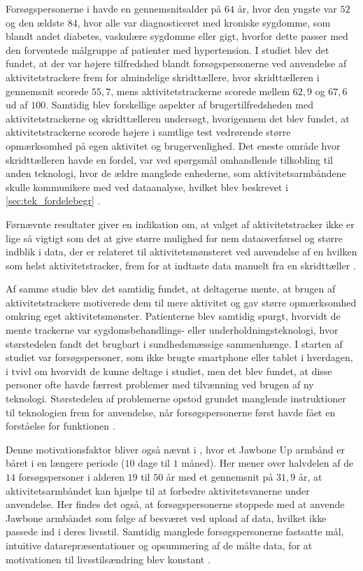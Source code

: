 Forsøgspersonerne i \citeauthor{mercer2016} havde en gennemsnitsalder på $64$ år, hvor den yngste var $52$ og den ældste $84$, hvor alle var diagnosticeret med kroniske sygdomme, som blandt andet diabetes, vaskulære sygdomme eller gigt, hvorfor dette passer med den forventede målgruppe af patienter med hypertension. I studiet blev det fundet, at der var højere tilfredshed blandt forsøgspersonerne ved anvendelse af aktivitetstrackere frem for almindelige skridttællere, hvor skridttælleren i gennemsnit scorede $55,7$, mens aktivitetstrackerne scorede mellem $62,9$ og $67,6$ ud af $100$. Samtidig blev forskellige aspekter af brugertilfredsheden med aktivitetstrackerne og skridttælleren undersøgt, hvorigennem det blev fundet, at aktivitetstrackerne scorede højere i samtlige test vedrørende større opmærksomhed på egen aktivitet og brugervenlighed. Det eneste område hvor skridttælleren havde en fordel, var ved spørgsmål omhandlende tilkobling til anden teknologi, hvor de ældre manglede enhederne, som aktivitetsarmbåndene skulle kommunikere med ved dataanalyse, hvilket blev beskrevet i \autoref{sec:tek_fordelebegr} \citep{mercer2016}.

Førnævnte resultater giver en indikation om, at valget af aktivitetstracker ikke er lige så vigtigt som det at give større mulighed for nem dataoverførsel og større indblik i data, der er relateret til aktivitetsmønsteret ved anvendelse af en hvilken som helst aktivitetstracker, frem for at indtaste data manuelt fra en skridttæller \citep{mercer2016}.

Af samme studie blev det samtidig fundet, at deltagerne mente, at brugen af aktivitetstrackere motiverede dem til mere aktivitet og gav større opmærksomhed omkring eget aktivitetsmønster. Patienterne blev samtidig spurgt, hvorvidt de mente trackerne var sygdomsbehandlings- eller underholdningsteknologi, hvor størstedelen fandt det brugbart i sundhedsmæssige sammenhænge. I starten af studiet var forsøgspersoner, som ikke brugte smartphone eller tablet i hverdagen, i tvivl om hvorvidt de kunne deltage i studiet, men det blev fundet, at disse personer ofte havde færrest problemer med tilvænning ved brugen af ny teknologi. Størstedelen af problemerne opstod grundet manglende instruktioner til teknologien frem for anvendelse, når forsøgspersonerne først havde fået en forståelse for funktionen \citep{mercer2016}.

Denne motivationsfaktor bliver også nævnt i \citeauthor{rapp2016}, hvor et Jawbone Up armbånd er båret i en længere periode ($10$ dage til $1$ måned). Her mener over halvdelen af de $14$ forsøgspersoner i alderen $19$ til $50$ år med et gennemsnit på $31,9$ år, at aktivitetsarmbåndet kan hjælpe til at forbedre aktivitetsvanerne under anvendelse. Her findes det også, at forsøgspersonerne stoppede med at anvende Jawbone armbåndet som følge af besværet ved upload af data, hvilket ikke passede ind i deres livsstil. Samtidig manglede forsøgspersonerne fastsatte mål, intuitive datarepræsentationer og opsummering af de målte data, for at motivationen til livsstilsændring blev konstant \citep{rapp2016}.

